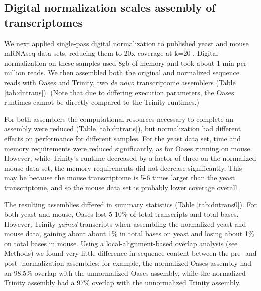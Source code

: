 \documentclass[10pt]{article}
\begin{document}

\subsection*{Digital normalization scales assembly of transcriptomes}

We next applied single-pass digital normalization to published yeast
and mouse mRNAseq data sets, reducing them to 20x coverage at k=20
\cite{pubmed21572440}.
Digital normalization on these samples used 8gb of memory and took
about 1 min per million reads.  We then assembled both the original and
normalized sequence reads with Oases and Trinity, two {\em de novo}
transcriptome assemblers (Table \ref{tab:dntrans}).  (Note that due to
differing execution parameters, the Oases runtimes cannot be directly compared
to the Trinity runtimes.)

For both assemblers the computational resources necessary to complete an
assembly were reduced (Table \ref{tab:dntrans}), but normalization had
different effects on performance for different samples.  For the yeast
data set, time and memory requirements were reduced significantly,
as for Oases running on mouse.  However, while Trinity's runtime decreased
by a factor of three on the normalized mouse data set, the memory requirements
did not decrease significantly.  This may be because the mouse transcriptome
is 5-6 times larger than the yeast transcriptome, and so the mouse data set
is probably lower coverage overall.


The resulting assemblies differed in summary statistics (Table
\ref{tab:dntrans0}).  For both yeast and mouse, Oases lost 5-10\% of
total transcripts and total bases.  However, Trinity {\em gained}
transcripts when assembling the normalized yeast and mouse data,
gaining about about 1\% in total bases on yeast and losing about 1\%
on total bases in mouse.  Using a local-alignment-based overlap
analysis (see Methods) we found very little difference in sequence
content between the pre- and post- normalization assemblies: for
example, the normalized Oases assembly had an 98.5\% overlap with the
unnormalized Oases assembly, while the normalized Trinity assembly had
a 97\% overlap with the unnormalized Trinity assembly.
\end{document}
